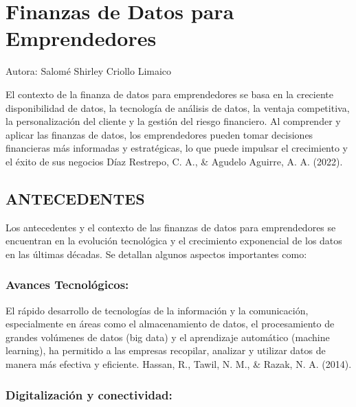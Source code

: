 \documentclass[
  letterpaper,
  DIV=11,
  numbers=noendperiod]{scrreprt}
\begin{document}

\hypertarget{finanzas-de-datos-para-emprendedores}{%
\chapter{Finanzas de Datos para
Emprendedores}\label{finanzas-de-datos-para-emprendedores}}

Autora: Salomé Shirley Criollo Limaico

El contexto de la finanza de datos para emprendedores se basa en la
creciente disponibilidad de datos, la tecnología de análisis de datos,
la ventaja competitiva, la personalización del cliente y la gestión del
riesgo financiero. Al comprender y aplicar las finanzas de datos, los
emprendedores pueden tomar decisiones financieras más informadas y
estratégicas, lo que puede impulsar el crecimiento y el éxito de sus
negocios Díaz Restrepo, C. A., \& Agudelo Aguirre, A. A. (2022).

\hypertarget{antecedentes}{%
\section{ANTECEDENTES}\label{antecedentes}}

Los antecedentes y el contexto de las finanzas de datos para
emprendedores se encuentran en la evolución tecnológica y el crecimiento
exponencial de los datos en las últimas décadas. Se detallan algunos
aspectos importantes como:

\hypertarget{avances-tecnoluxf3gicos}{%
\subsection{Avances Tecnológicos:}\label{avances-tecnoluxf3gicos}}

El rápido desarrollo de tecnologías de la información y la comunicación,
especialmente en áreas como el almacenamiento de datos, el procesamiento
de grandes volúmenes de datos (big data) y el aprendizaje automático
(machine learning), ha permitido a las empresas recopilar, analizar y
utilizar datos de manera más efectiva y eficiente. Hassan, R., Tawil, N.
M., \& Razak, N. A. (2014).

\hypertarget{digitalizaciuxf3n-y-conectividad}{%
\subsection{Digitalización y
conectividad:}\label{digitalizaciuxf3n-y-conectividad}}
\end{document}
